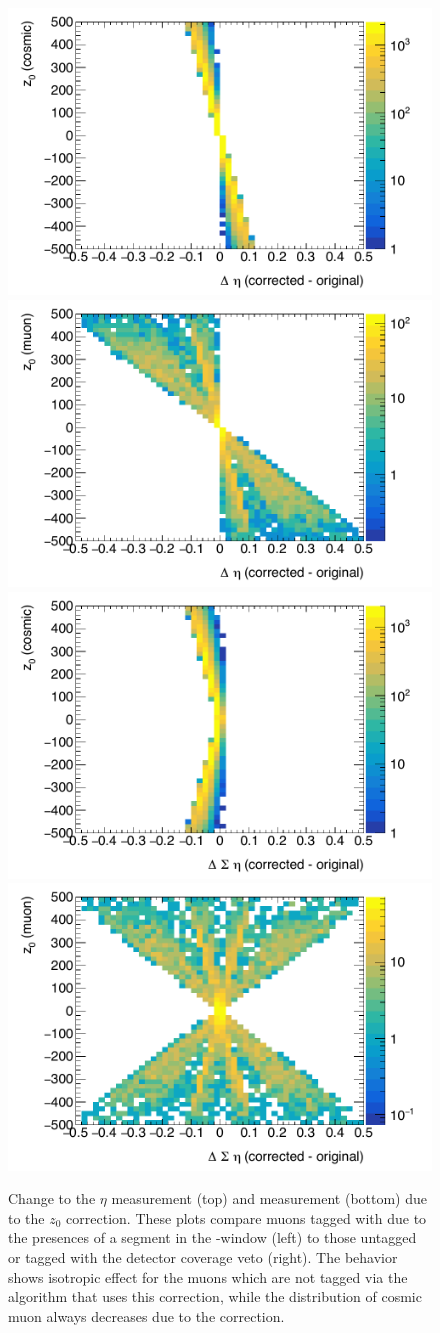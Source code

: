 \begin{figure}[!ht]
\centering
\includegraphics[width=.48\textwidth]{figures/cosmics/cosnotmv_z0_dEta_corr.pdf}
\includegraphics[width=.48\textwidth]{figures/cosmics/mvmu_z0_dEta_corr.pdf}
\includegraphics[width=.48\textwidth]{figures/cosmics/cosnotmv_z0_dSeta_corr.pdf}
\includegraphics[width=.48\textwidth]{figures/cosmics/mvmu_z0_dSeta_corr.pdf}
\caption{Change to the $\eta$ measurement (top) and \sigeta measurement (bottom) due to the $z_{0}$ correction. These plots compare muons tagged with due to the presences of a segment in the \dphicos-\sigeta window (left) to those untagged or tagged with the detector coverage veto (right). The behavior shows isotropic effect for the muons which are not tagged via the algorithm that uses this correction, while the \sigeta distribution of cosmic muon always decreases due to the correction.}
\label{fig:changeEta}
\end{figure}


